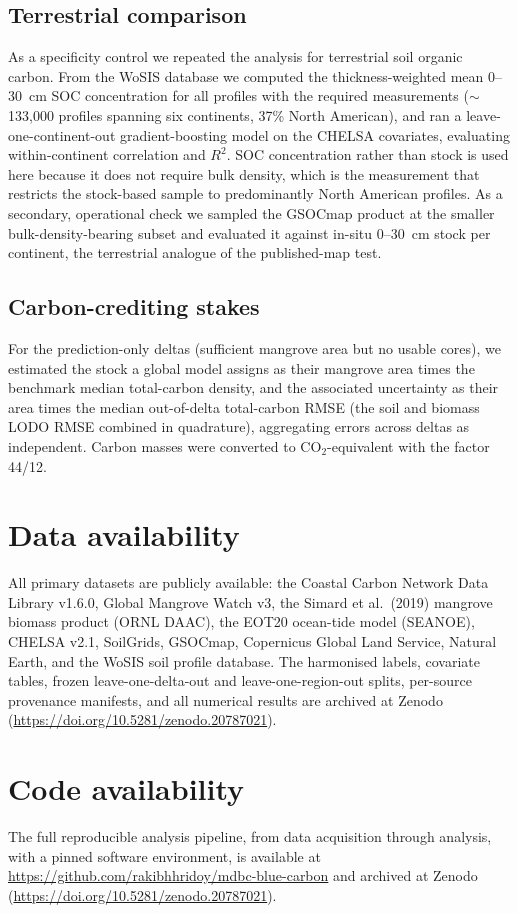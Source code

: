\documentclass[twocolumn,9pt]{extarticle}
\begin{document}
\subsection*{Terrestrial comparison}
As a specificity control we repeated the analysis for terrestrial soil organic carbon.
From the WoSIS database we computed the thickness-weighted mean 0--30~cm SOC concentration
for all profiles with the required measurements ($\sim$133{,}000 profiles spanning six
continents, 37\% North American), and ran a leave-one-continent-out gradient-boosting
model on the CHELSA covariates, evaluating within-continent correlation and $R^2$. SOC
concentration rather than stock is used here because it does not require bulk density,
which is the measurement that restricts the stock-based sample to predominantly North
American profiles. As a secondary, operational check we sampled the GSOCmap product at
the smaller bulk-density-bearing subset and evaluated it against in-situ 0--30~cm stock
per continent, the terrestrial analogue of the published-map test.

\subsection*{Carbon-crediting stakes}
For the prediction-only deltas (sufficient mangrove area but no usable cores), we
estimated the stock a global model assigns as their mangrove area times the benchmark
median total-carbon density, and the associated uncertainty as their area times the
median out-of-delta total-carbon RMSE (the soil and biomass LODO RMSE combined in
quadrature), aggregating errors across deltas as independent. Carbon masses were
converted to CO$_2$-equivalent with the factor 44/12.

\section*{Data availability}
All primary datasets are publicly available: the Coastal Carbon Network Data Library
v1.6.0, Global Mangrove Watch v3, the Simard et al.\ (2019) mangrove biomass product
(ORNL DAAC), the EOT20 ocean-tide model (SEANOE), CHELSA v2.1, SoilGrids, GSOCmap,
Copernicus Global Land Service, Natural Earth, and the WoSIS soil profile database. The
harmonised labels, covariate tables, frozen leave-one-delta-out and leave-one-region-out
splits, per-source provenance manifests, and all numerical results are archived at Zenodo
(\url{https://doi.org/10.5281/zenodo.20787021}).

\section*{Code availability}
The full reproducible analysis pipeline, from data acquisition through analysis, with a
pinned software environment, is available at
\url{https://github.com/rakibhhridoy/mdbc-blue-carbon} and archived at Zenodo
(\url{https://doi.org/10.5281/zenodo.20787021}).
\end{document}
